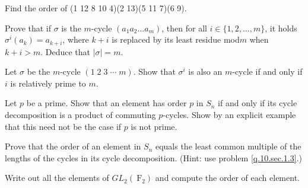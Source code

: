 \documentclass[
    11pt,a4paper,
]{exam}
\begin{document}
\begin{questions}
    
    
    
    
    
    \question
    Find the order of (1 12 8 10 4)(2 13)(5 11 7)(6 9).
    
    
    
    
    
    \question\label{q.10.sec.1.3}
    Prove that if \(\sigma\) is the \(m\)-cycle \(\left(a_1 a_2 \ldots a_m\right)\), then for all \(i \in\{1,2, \ldots, m\}\), it holds \(\sigma^i\left(a_k\right)=a_{k+i}\), where \(k+i\) is replaced by its least residue mod\;\(m\) when \(k+i>m\). Deduce that \(|\sigma|=m\).
    
    \question
    Let \(\sigma\) be the \(m\)-cycle \((1\; 2\; 3\; \cdots\; m)\). Show that \(\sigma^i\) is also an \(m\)-cycle if and only if \(i\) is relatively prime to \(m\).
    
    
    \question
    Let \(p\) be a prime. Show that an element has order \(p\) in \(S_n\) if and only if its cycle decomposition is a product of commuting \(p\)-cycles. Show by an explicit example that this need not be the case if \(p\) is not prime.
    
    \question
    Prove that the order of an element in \(S_n\) equals the least common multiple of the lengths of the cycles in its cycle decomposition. (Hint: use problem \ref{q.10.sec.1.3}.)
    
    
    
    
    
    
    \question
    Write out all the elements of \(G L_2\left(\mathrm{~F}_2\right)\) and compute the order of each element.
    

\end{questions}
\end{document}

